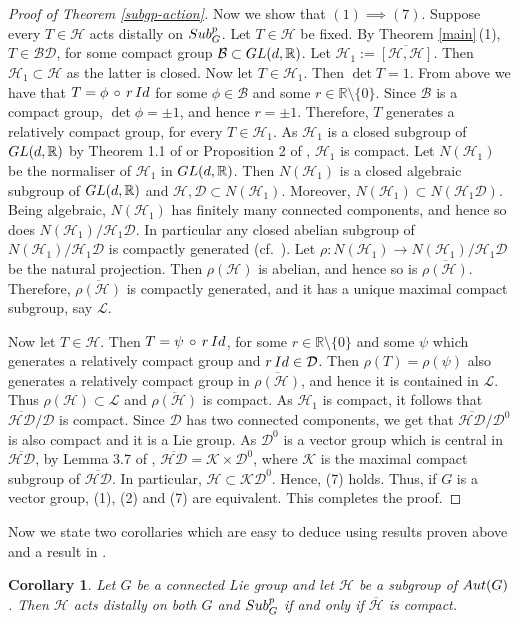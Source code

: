 \documentclass{amsart}
\numberwithin{equation}{section}
\newcommand{\Aut}{{\rm Aut}}
\newcommand{\R}{{\mathbb R}}
\newcommand{\Hc}{{\mathcal H}}
\newcommand{\K}{{\mathcal K}}
\newcommand{\D}{{\mathcal D}}
\newcommand{\Bc}{{\mathcal B}}
\newcommand{\spg}{{\rm Sub}^p_G}
\newcommand{\Id}{{\rm Id}}
\newcommand{\GL}{{\rm GL}}
\let\ol=\overline
\let\mi=\setminus
\newtheorem{cor}[thm]{Corollary}
\theoremstyle{remark}
\begin{document}
\begin{proof}[Proof of Theorem \ref{subgp-action}]
Now we show that $(1)\implies (7)$. Suppose every $T\in \Hc$ acts distally on $\spg$. Let $T\in \Hc$ be fixed. 
By Theorem \ref{main}\,(1), $T\in \Bc\D$, for some compact group $\Bc\subset\GL(d,\R)$. Let 
$\Hc_1:=\ol{[\Hc,\Hc]}$. Then $\Hc_1\subset \Hc$ as the latter is closed. Now let $T\in\Hc_1$. Then $\det T=1$.
From above we have that $T=\phi\,\circ\,r\,\Id$ for some $\phi\in\Bc$ and some 
$r\in\R\mi\{0\}$. Since $\Bc$ is a compact group, $\det\phi=\pm 1$, and hence $r=\pm 1$. Therefore, 
$T$ generates a relatively compact group, for every $T\in \Hc_1$. As $\Hc_1$ is a closed subgroup of 
$\GL(d,\R)$ by Theorem 1.1 of \cite{FP} or Proposition 2 of \cite{SY1}, $\Hc_1$ is compact. 
Let $N(\Hc_1)$ be the normaliser of $\Hc_1$ in $\GL(d,\R)$. Then $N(\Hc_1)$ is a closed algebraic 
subgroup of $\GL(d,\R)$ and $\Hc,\D\subset N(\Hc_1)$. Moreover, $N(\Hc_1)\subset N(\Hc_1\D)$. 
Being algebraic, $N(\Hc_1)$ has finitely many connected components, and hence so does 
$N(\Hc_1)/\Hc_1\D$. In particular any closed abelian subgroup of $N(\Hc_1)/\Hc_1\D$ is compactly generated 
(cf.\ \cite{HN}). Let $\rho: N(\Hc_1)\to N(\Hc_1)/\Hc_1\D$ be the natural projection. Then $\rho(\Hc)$ is abelian, 
and hence so is $\ol{\rho(\Hc)}$. Therefore, $\ol{\rho(\Hc)}$ is compactly generated, and it has a unique maximal 
compact subgroup, say $\mathcal{L}$. 

Now let $T\in \Hc$. Then $T=\psi\,\circ\,r\,\Id$, for some $r\in\R\setminus\{0\}$ and some $\psi$ which generates 
a relatively compact group and $r\,\Id\in \D$. Then $\rho(T)=\rho(\psi)$ also generates a relatively compact 
group in $\ol{\rho(\Hc)}$, and hence it is contained in $\mathcal{L}$. Thus $\rho(\Hc)\subset \mathcal{L}$ and $\ol{\rho(\Hc)}$ 
is compact. As $\Hc_1$ is compact, it follows that $\ol{\Hc\D}/\D$ is compact. Since $\D$ 
has two connected components, we get that $\ol{\Hc\D}/\D^0$ is also compact and it is a Lie group. 
As $\D^0$ is a vector group which is central in $\ol{\Hc\D}$, by Lemma 3.7 of \cite{I}, 
$\ol{\Hc\D}=\K\times \D^0$, where $\K$ is the maximal compact subgroup of $\ol{\Hc\D}$. 
In particular, $\Hc\subset \K\D^0$. Hence, (7) holds. Thus, if $G$ is a vector group, (1), (2) and (7) 
are equivalent. This completes the proof. 
\end{proof}

Now we state two corollaries which are easy to deduce using results proven above and a result in \cite{Ab1}.

\begin{cor} \label{distal-gspg} Let $G$ be a connected Lie group and let $\Hc$ be a subgroup of $\Aut(G)$. 
Then $\Hc$ acts distally on both $G$ and $\spg$ if and only if $\ol{\Hc}$ is compact. 
\end{cor}
\end{document}
